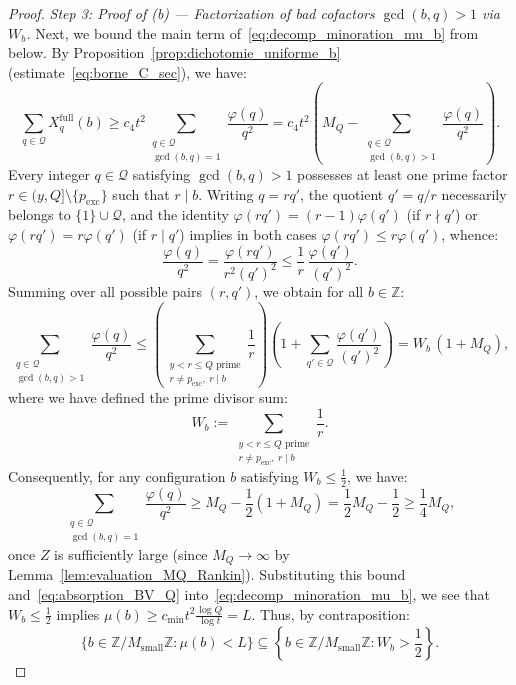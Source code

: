 \documentclass[11pt, a4paper]{article}
\theoremstyle{plain}
\theoremstyle{definition}
\newcommand{\Z}{\mathbb{Z}}
\begin{document}
\begin{proof}
\medskip\noindent
\emph{Step 3: Proof of (b) --- Factorization of bad cofactors $\gcd(b,q) > 1$ via $W_b$.} Next, we bound the main term of~\eqref{eq:decomp_minoration_mu_b} from below. By Proposition~\ref{prop:dichotomie_uniforme_b} (estimate~\eqref{eq:borne_C_sec}), we have:
\begin{equation}\label{eq:minoration_somme_Xq}
\sum_{q \in \mathcal{Q}} X_q^{\mathrm{full}}(b) \ge c_4 t^2 \sum_{\substack{q \in \mathcal{Q} \\ \gcd(b,q)=1}} \frac{\varphi(q)}{q^2} = c_4 t^2 \left( M_Q - \sum_{\substack{q \in \mathcal{Q} \\ \gcd(b,q) > 1}} \frac{\varphi(q)}{q^2} \right).
\end{equation}
Every integer $q \in \mathcal{Q}$ satisfying $\gcd(b, q) > 1$ possesses at least one prime factor $r \in (y, Q] \setminus \{p_{\mathrm{exc}}\}$ such that $r \mid b$. Writing $q = r q'$, the quotient $q' = q/r$ necessarily belongs to $\{1\} \cup \mathcal{Q}$, and the identity $\varphi(rq') = (r-1)\varphi(q')$ (if $r \nmid q'$) or $\varphi(rq') = r\varphi(q')$ (if $r \mid q'$) implies in both cases $\varphi(rq') \le r\varphi(q')$, whence:
\[
\frac{\varphi(q)}{q^2} = \frac{\varphi(rq')}{r^2 (q')^2} \le \frac{1}{r}\,\frac{\varphi(q')}{(q')^2}.
\]
Summing over all possible pairs $(r, q')$, we obtain for all $b \in \Z$:
\[
\sum_{\substack{q \in \mathcal{Q} \\ \gcd(b,q) > 1}} \frac{\varphi(q)}{q^2} \le \left( \sum_{\substack{y < r \le Q \text{ prime} \\ r \ne p_{\mathrm{exc}},\ r \mid b}} \frac{1}{r} \right) \left( 1 + \sum_{q' \in \mathcal{Q}} \frac{\varphi(q')}{(q')^2} \right) = W_b\,(1 + M_Q),
\]
where we have defined the prime divisor sum:
\begin{equation}\label{eq:def_Wb}
W_b := \sum_{\substack{y < r \le Q \text{ prime} \\ r \ne p_{\mathrm{exc}},\ r \mid b}} \frac{1}{r}.
\end{equation}
Consequently, for any configuration $b$ satisfying $W_b \le \frac{1}{2}$, we have:
\[
\sum_{\substack{q \in \mathcal{Q} \\ \gcd(b,q)=1}} \frac{\varphi(q)}{q^2} \ge M_Q - \frac{1}{2}(1 + M_Q) = \frac{1}{2} M_Q - \frac{1}{2} \ge \frac{1}{4} M_Q,
\]
once $Z$ is sufficiently large (since $M_Q \to \infty$ by Lemma~\ref{lem:evaluation_MQ_Rankin}). Substituting this bound and~\eqref{eq:absorption_BV_Q} into~\eqref{eq:decomp_minoration_mu_b}, we see that $W_b \le \frac{1}{2}$ implies $\mu(b) \ge c_{\min} t^2 \frac{\log Q}{\log t} = L$. Thus, by contraposition:
\begin{equation}\label{eq:inclusion_evenement_Wb}
\big\{ b \in \Z / M_{\mathrm{small}} \Z : \mu(b) < L \big\} \subseteq \left\{ b \in \Z / M_{\mathrm{small}} \Z : W_b > \frac{1}{2} \right\}.
\end{equation}


\end{proof}
\end{document}
